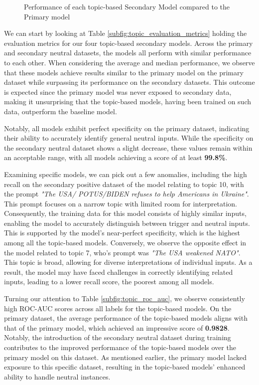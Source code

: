 \begin{figure}[ht]
    \vspace{7pt}

    \caption{Performance of each topic-based Secondary Model compared to the Primary model}
    \label{fig:topic_sec_models_evaluation}
\end{figure}

We can start by looking at Table \ref{subfig:topic_evaluation_metrics} holding the evaluation metrics for our four topic-based secondary models. Across the primary and secondary neutral datasets, the models all perform with similar performance to each other. When considering the average and median performance, we observe that these models achieve results similar to the primary model on the primary dataset while surpassing its performance on the secondary datasets. This outcome is expected since the primary model was never exposed to secondary data, making it unsurprising that the topic-based models, having been trained on such data, outperform the baseline model.

Notably, all models exhibit perfect specificity on the primary dataset, indicating their ability to accurately identify general neutral inputs. While the specificity on the secondary neutral dataset shows a slight decrease, these values remain within an acceptable range, with all models achieving a score of at least \textbf{99.8\%}.

Examining specific models, we can pick out a few anomalies, including the high recall on the secondary positive dataset of the model relating to topic 10, with the prompt \textit{"The USA/ POTUS/BIDEN refuses to help Americans in Ukraine"}. This prompt focuses on a narrow topic with limited room for interpretation. Consequently, the training data for this model consists of highly similar inputs, enabling the model to accurately distinguish between trigger and neutral inputs. This is supported by the model's near-perfect specificity, which is the highest among all the topic-based models. Conversely, we observe the opposite effect in the model related to topic 7, who's prompt was \textit{"The USA weakened NATO"}. This topic is broad, allowing for diverse interpretations of individual inputs. As a result, the model may have faced challenges in correctly identifying related inputs, leading to a lower recall score, the poorest among all models.

Turning our attention to Table \ref{subfig:topic_roc_auc}, we observe consistently high ROC-AUC scores across all labels for the topic-based models. On the primary dataset, the average performance of the topic-based models aligns with that of the primary model, which achieved an impressive score of \textbf{0.9828}. Notably, the introduction of the secondary neutral dataset during training contributes to the improved performance of the topic-based models over the primary model on this dataset. As mentioned earlier, the primary model lacked exposure to this specific dataset, resulting in the topic-based models' enhanced ability to handle neutral instances.


